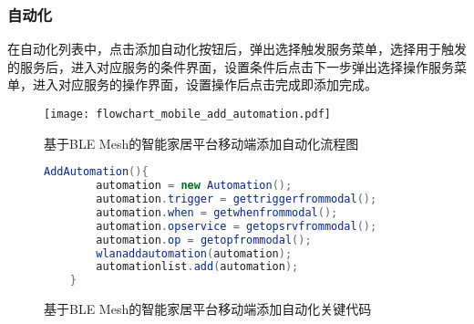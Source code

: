 \subsubsection{自动化}
在自动化列表中，点击添加自动化按钮后，弹出选择触发服务菜单，选择用于触发的服务后，进入对应服务的条件界面，设置条件后点击下一步弹出选择操作服务菜单，进入对应服务的操作界面，设置操作后点击完成即添加完成。

\begin{figure}[H]
    \centering
    \texttt{[image: flowchart\_mobile\_add\_automation.pdf]}
    \caption{基于BLE Mesh的智能家居平台移动端添加自动化流程图}
    \label{fig:flowchart_mobile_connect}
\end{figure}

\begin{figure}[H]
    \centering
    \begin{lstlisting}[language=Java]
    AddAutomation(){
        automation = new Automation();
        automation.trigger = gettriggerfrommodal();
        automation.when = getwhenfrommodal();
        automation.opservice = getopsrvfrommodal();
        automation.op = getopfrommodal();
        wlanaddautomation(automation);
        automationlist.add(automation);
    }
    \end{lstlisting}
    \caption{基于BLE Mesh的智能家居平台移动端添加自动化关键代码}
    \label{fig:code_mobile_add_automation}
\end{figure}